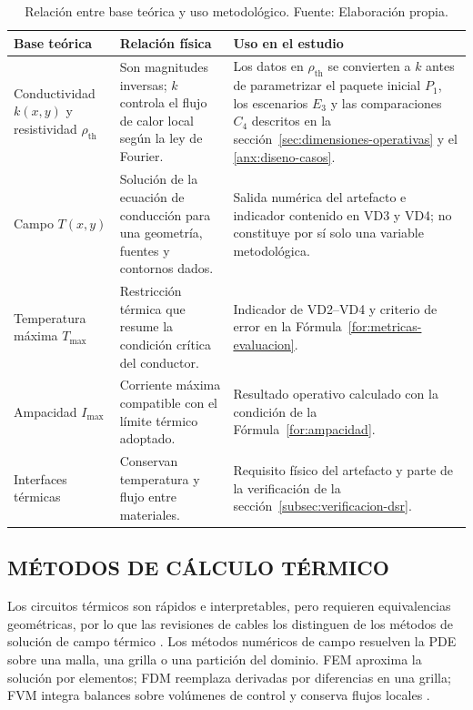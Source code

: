 \documentclass[11pt,a4paper,oneside]{report}
\renewcommand{\arraystretch}{1.18}
\newcommand{\Tmax}{T_{\max}}
\newcommand{\Imax}{I_{\max}}
\newcommand{\kx}{k(x,y)}
\newcommand{\rhoth}{\rho_{\mathrm{th}}}
\begin{document}
\begin{table}[htbp]
\centering
\caption{Relación entre base teórica y uso metodológico. Fuente: Elaboración propia.}
\label{tab:base-teorica-uso}
\begingroup
\footnotesize
\setlength{\tabcolsep}{3pt}
\renewcommand{\arraystretch}{1.25}
\begin{tabularx}{\textwidth}{L{3.2cm}Y Y}
\toprule
\textbf{Base teórica} & \textbf{Relación física} & \textbf{Uso en el estudio} \\
\midrule
Conductividad $\kx$ y resistividad $\rhoth$ & Son magnitudes inversas; $k$ controla el flujo de calor local según la ley de Fourier. & Los datos en $\rhoth$ se convierten a $k$ antes de parametrizar el paquete inicial $P_1$, los escenarios $E_3$ y las comparaciones $C_4$ descritos en la sección~\ref{sec:dimensiones-operativas} y el \ref{anx:diseno-casos}. \\
Campo $T(x,y)$ & Solución de la ecuación de conducción para una geometría, fuentes y contornos dados. & Salida numérica del artefacto e indicador contenido en VD3 y VD4; no constituye por sí solo una variable metodológica. \\
Temperatura máxima $\Tmax$ & Restricción térmica que resume la condición crítica del conductor. & Indicador de VD2--VD4 y criterio de error en la Fórmula~\ref{for:metricas-evaluacion}. \\
Ampacidad $\Imax$ & Corriente máxima compatible con el límite térmico adoptado. & Resultado operativo calculado con la condición de la Fórmula~\ref{for:ampacidad}. \\
Interfaces térmicas & Conservan temperatura y flujo entre materiales. & Requisito físico del artefacto y parte de la verificación de la sección~\ref{subsec:verificacion-dsr}. \\
\bottomrule
\end{tabularx}
\endgroup
\end{table}

\subsection{MÉTODOS DE CÁLCULO TÉRMICO}
\label{subsec:metodos-calculo-termico}

Los circuitos térmicos son rápidos e interpretables, pero requieren equivalencias geométricas, por lo que las revisiones de cables los distinguen de los métodos de solución de campo térmico \parencite[4--6]{enescu2021}. Los métodos numéricos de campo resuelven la PDE sobre una malla, una grilla o una partición del dominio. FEM aproxima la solución por elementos; FDM reemplaza derivadas por diferencias en una grilla; FVM integra balances sobre volúmenes de control y conserva flujos locales \parencites{patankar1980numerical}[3--4,93--99]{cigre2025}.
\end{document}
